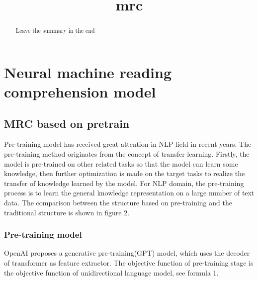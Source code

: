 \documentclass{article}
\title{mrc}
\date{}
\begin{document}
    \maketitle %
	\begin{abstract}
		Leave the summary in the end
	\end{abstract}





\section{Neural machine reading comprehension model}





\subsection{MRC based on pretrain}
Pre-training model has received great attention in NLP field in recent years. The pre-training method originates from the concept of 
transfer learning. Firstly, the model is pre-trained on other related tasks so that the model can learn some knowledge, then further optimization is made 
on the target tasks to realize the transfer of knowledge learned by the model. For NLP domain, the pre-training process is to learn the general knowledge 
representation on a large number of text data. The comparison between the structure based on pre-training and the traditional structure is shown in figure 2. 

\subsubsection{Pre-training model}
OpenAI proposes a generative pre-training(GPT) model, which uses the decoder of transformer as feature extractor. The objective function of pre-training stage is 
the objective function of unidirectional language model, see formula 1. 
\end{document}
